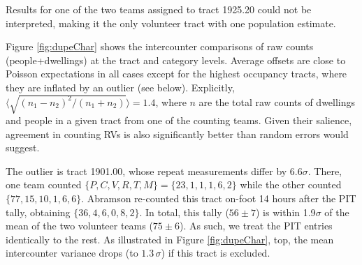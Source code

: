 \documentclass[11pt,twocolumn]{article}
\begin{document}
Results for one of the two teams assigned to tract 1925.20 could not be interpreted, making it the only
volunteer tract with one population estimate.

Figure \ref{fig:dupeChar} shows the intercounter comparisons of raw counts (people+dwellings)
at the tract and category levels. Average offsets are close to Poisson expectations in all cases 
except for the highest occupancy tracts, where they are inflated by an outlier (see below).
Explicitly, $\langle\sqrt{(n_{1}-n_{2})^{2}/(n_{1} + n_{2})}\rangle=1.4$, where
$n$ are the total raw counts of dwellings and people in a given tract from one of the counting
teams. Given their salience, agreement in counting RVs is also significantly better than random 
errors would suggest.

The outlier is tract 1901.00, whose repeat measurements differ by $6.6\sigma$. There, 
one team counted $\{P,C,V,R,T,M\}=\{23,1,1,1,6,2\}$ while the other counted $\{77,15,10,1,6,6\}$. 
Abramson re-counted this tract on-foot 14 hours after the PIT tally, obtaining $\{36, 4, 6, 0, 8, 2\}$.
In total, this tally ($56\pm7$) is within 1.9$\sigma$ of the mean of the two volunteer teams ($75\pm6$). 
As such, we treat the PIT entries identically to the rest.  As illustrated in Figure \ref{fig:dupeChar}, top,
the mean intercounter variance drops (to $1.3\,\sigma$) if this tract is excluded.


\end{document}
